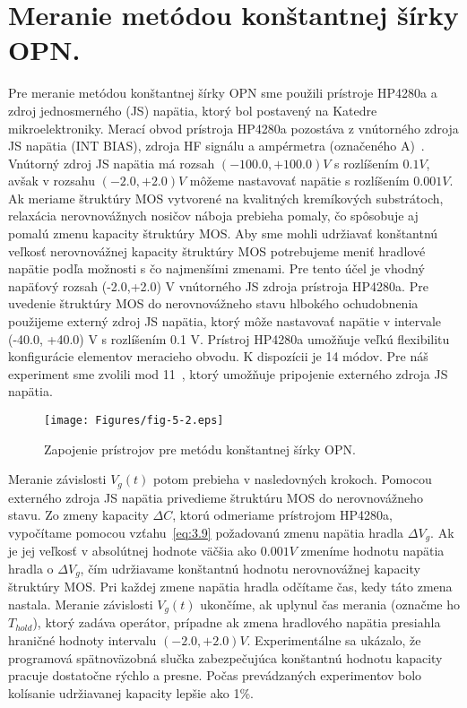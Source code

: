 \section{Meranie metódou konštantnej šírky OPN.}\label{sec:5.3}

Pre meranie metódou konštantnej šírky OPN sme použili prístroje
HP4280a a zdroj jednosmerného (JS) napätia, ktorý bol postavený na
Katedre mikroelektroniky. Merací obvod prístroja HP4280a pozostáva z
vnútorného zdroja JS napätia (INT BIAS), zdroja HF signálu a
ampérmetra (označeného A)~\cite{5.7}. Vnútorný zdroj JS napätia má
rozsah $(-100.0,+100.0)V$ s rozlíšením $0.1V$, avšak v rozsahu
$(-2.0,+2.0)V$ môžeme nastavovať napätie s rozlíšením $0.001V$. Ak
meriame štruktúry MOS vytvorené na kvalitných kremíkových substrátoch,
relaxácia nerovnovážnych nosičov náboja prebieha pomaly, čo spôsobuje
aj pomalú zmenu kapacity štruktúry MOS\@. Aby sme mohli udržiavať
konštantnú veľkosť nerovnovážnej kapacity štruktúry MOS potrebujeme
meniť hradlové napätie podľa možnosti s čo najmenšími zmenami. Pre
tento účel je vhodný napäťový rozsah (-2.0,+2.0) V vnútorného JS
zdroja prístroja HP4280a. Pre uvedenie štruktúry MOS do nerovnovážneho
stavu hlbokého ochudobnenia použijeme externý zdroj JS napätia, ktorý
môže nastavovať napätie v intervale (-40.0, +40.0) V s rozlíšením 0.1
V. Prístroj HP4280a umožňuje veľkú flexibilitu konfigurácie elementov
meracieho obvodu. K dispozícii je 14 módov. Pre náš experiment sme
zvolili mod 11~\cite{5.2}, ktorý umožňuje pripojenie externého zdroja
JS napätia.

\begin{figure}[h!]\centering
  \texttt{[image: Figures/fig-5-2.eps]}
  \caption[Zapojenie prístrojov pre metódu konštantnej šírky
    OPN]{Zapojenie prístrojov pre metódu konštantnej šírky
    OPN.}\label{fig:5.2}
\end{figure}

Meranie závislosti $V_{g}(t)$ potom prebieha v nasledovných
krokoch. Pomocou externého zdroja JS napätia privedieme štruktúru MOS
do nerovnovážneho stavu. Zo zmeny kapacity $\Delta{C}$, ktorú
odmeriame prístrojom HP4280a, vypočítame pomocou vzťahu~\ref{eq:3.9}
požadovanú zmenu napätia hradla $\Delta{V_{g}}$. Ak je jej veľkosť v
absolútnej hodnote väčšia ako $0.001 V$ zmeníme hodnotu napätia hradla
o $\Delta{V_{g}}$, čím udržiavame konštantnú hodnotu nerovnovážnej
kapacity štruktúry MOS\@. Pri každej zmene napätia hradla odčítame
čas, kedy táto zmena nastala. Meranie závislosti $V_{g}(t)$ ukončíme,
ak uplynul čas merania (označme ho $T_{hold}$), ktorý zadáva operátor,
prípadne ak zmena hradlového napätia presiahla hraničné hodnoty
intervalu $(-2.0,+2.0) V$.  Experimentálne sa ukázalo, že programová
spätnoväzobná slučka zabezpečujúca konštantnú hodnotu kapacity pracuje
dostatočne rýchlo a presne. Počas prevádzaných experimentov bolo
kolísanie udržiavanej kapacity lepšie ako 1\%.

